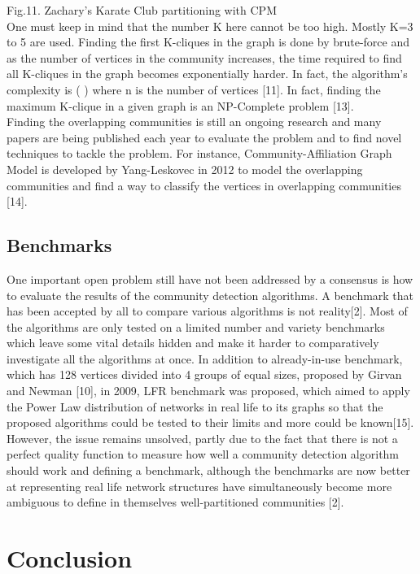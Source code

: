 \documentclass[10pt]{article}
\begin{document}
Fig.11. Zachary’s Karate Club partitioning with CPM \\

One must keep in mind that the number K here cannot be too high. Mostly K=3 to 5 are used. Finding the first K-cliques in the graph is done by brute-force and as the number of vertices in the community increases, the time required to find all K-cliques in the graph becomes exponentially harder. In fact, the algorithm’s complexity is ( ) where n is the number of vertices [11]. In fact, finding the maximum K-clique in a given graph is an NP-Complete problem [13]. \\

Finding the overlapping communities is still an ongoing research and many papers are being published each year to evaluate the problem and to find novel techniques to tackle the problem. For instance, Community-Affiliation Graph Model is developed by Yang-Leskovec in 2012 to model the overlapping communities and find a way to classify the vertices in overlapping communities [14]. \\

\subsection{Benchmarks}
One important open problem still have not been addressed by a consensus is how to evaluate the results of the community detection algorithms. A benchmark that has been accepted by all to compare various algorithms is not reality[2]. Most of the algorithms are only tested on a limited number and variety benchmarks which leave some vital details hidden and make it harder to comparatively investigate all the algorithms at once. In addition to already-in-use benchmark, which has 128 vertices divided into 4 groups of equal sizes, proposed by Girvan and Newman [10], in 2009, LFR benchmark was proposed, which aimed to apply the Power Law distribution of networks in real life to its graphs so that the proposed algorithms could be tested to their limits and more could be known[15]. However, the issue remains unsolved, partly due to the fact that there is not a perfect quality function to measure how well a community detection algorithm should work and defining a benchmark, although the benchmarks are now better at representing real life network structures have simultaneously become more ambiguous to define in themselves well-partitioned communities [2]. \\

\section{Conclusion} \\
\end{document}
